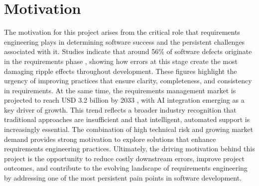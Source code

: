\section{Motivation}
The motivation for this project arises from the critical role that requirements engineering plays in determining software success and the persistent challenges associated with it. Studies indicate that around 56\% of software defects originate in the requirements phase \cite{3}, showing how errors at this stage create the most damaging ripple effects throughout development. These figures highlight the urgency of improving practices that ensure clarity, completeness, and consistency in requirements.
At the same time, the requirements management market is projected to reach USD 3.2 billion by 2033 \cite{4}, with AI integration emerging as a key driver of growth. This trend reflects a broader industry recognition that traditional approaches are insufficient and that intelligent, automated support is increasingly essential. The combination of high technical risk and growing market demand provides strong motivation to explore solutions that enhance requirements engineering practices.
Ultimately, the driving motivation behind this project is the opportunity to reduce costly downstream errors, improve project outcomes, and contribute to the evolving landscape of requirements engineering by addressing one of the most persistent pain points in software development.

